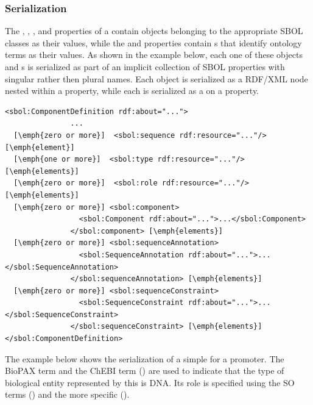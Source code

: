 \subsubsection*{Serialization}
The , ,  , and  properties of a  contain objects belonging to the appropriate SBOL classes as their values, while the  and  properties contain s that identify ontology terms as their values. As shown in the example below, each one of these objects and s is serialized as part of an implicit collection of SBOL properties with singular rather then plural names. Each object is serialized as a RDF/XML node nested within a property, while each  is serialized as a  on a property.

\begin{lstlisting}
<sbol:ComponentDefinition rdf:about="...">
               ...
  [\emph{zero or more}]  <sbol:sequence rdf:resource="..."/> [\emph{element}]
  [\emph{one or more}]  <sbol:type rdf:resource="..."/> [\emph{elements}]
  [\emph{zero or more}]  <sbol:role rdf:resource="..."/> [\emph{elements}]    
  [\emph{zero or more}] <sbol:component>
                 <sbol:Component rdf:about="...">...</sbol:Component>
               </sbol:component> [\emph{elements}]
  [\emph{zero or more}] <sbol:sequenceAnnotation>
                 <sbol:SequenceAnnotation rdf:about="...">...</sbol:SequenceAnnotation>
               </sbol:sequenceAnnotation> [\emph{elements}]        
  [\emph{zero or more}] <sbol:sequenceConstraint>
                 <sbol:SequenceConstraint rdf:about="...">...</sbol:SequenceConstraint>
               </sbol:sequenceConstraint> [\emph{elements}]        
</sbol:ComponentDefinition>
\end{lstlisting}

The example below shows the serialization of a simple  for a promoter. The BioPAX term  and the ChEBI term  () are used to indicate that the type of biological entity represented by this  is DNA. Its role is specified using the SO terms  () and the more specific  ().

